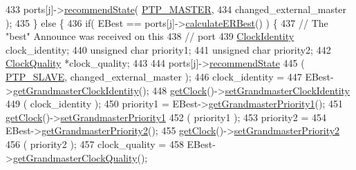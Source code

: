 \begin{DoxyCode}
433             ports[j]->\hyperlink{class_common_port_aa7588da5b66a33afeeda586e6abd334a}{recommendState}( \hyperlink{ptptypes_8hpp_a679431f1afc75d7bb9e972c022e53672ab4c763cac238b6403615a62111b64aa4}{PTP\_MASTER},
434                           changed\_external\_master );
435         \} \textcolor{keywordflow}{else} \{
436             \textcolor{keywordflow}{if}( EBest == ports[j]->\hyperlink{class_common_port_a6951410ed8e6a5ef44a028ef0a50cdeb}{calculateERBest}() ) \{
437                 \textcolor{comment}{// The "best" Announce was received on this}
438                 \textcolor{comment}{// port}
439                 \hyperlink{class_clock_identity}{ClockIdentity} clock\_identity;
440                 \textcolor{keywordtype}{unsigned} \textcolor{keywordtype}{char} priority1;
441                 \textcolor{keywordtype}{unsigned} \textcolor{keywordtype}{char} priority2;
442                 \hyperlink{struct_clock_quality}{ClockQuality} *clock\_quality;
443 
444                 ports[j]->\hyperlink{class_common_port_aa7588da5b66a33afeeda586e6abd334a}{recommendState}
445                     ( \hyperlink{ptptypes_8hpp_a679431f1afc75d7bb9e972c022e53672a55a1a2eb4b93c65e3bba86278510cb04}{PTP\_SLAVE}, changed\_external\_master );
446                 clock\_identity =
447                     EBest->\hyperlink{class_p_t_p_message_announce_aa9865dc21693b99907be1a5aa70aa8ae}{getGrandmasterClockIdentity}();
448                 \hyperlink{class_common_port_ab8e59ecfb51ec14e166bc8bfc872b1ef}{getClock}()->\hyperlink{class_i_e_e_e1588_clock_ab6eabbbfe58761a3db3b40721a0bd808}{setGrandmasterClockIdentity}
449                     ( clock\_identity );
450                 priority1 = EBest->\hyperlink{class_p_t_p_message_announce_a78151d3c07bb5d72555b8aec6d765f88}{getGrandmasterPriority1}();
451                 \hyperlink{class_common_port_ab8e59ecfb51ec14e166bc8bfc872b1ef}{getClock}()->\hyperlink{class_i_e_e_e1588_clock_a6d12713c65a9d60198a3d3bc27a77929}{setGrandmasterPriority1}
452                     ( priority1 );
453                 priority2 =
454                     EBest->\hyperlink{class_p_t_p_message_announce_a7bd53c122e2026948da666611d2529b9}{getGrandmasterPriority2}();
455                 \hyperlink{class_common_port_ab8e59ecfb51ec14e166bc8bfc872b1ef}{getClock}()->\hyperlink{class_i_e_e_e1588_clock_a74ab55d43941f7d4284d78c81e3cf8b3}{setGrandmasterPriority2}
456                     ( priority2 );
457                 clock\_quality =
458                     EBest->\hyperlink{class_p_t_p_message_announce_a4f7214e53f1413e39314947d39115809}{getGrandmasterClockQuality}();

\end{DoxyCode}
